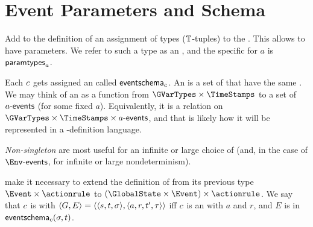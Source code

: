 \documentclass[12pt]{article}
\begin{document}
\section{Event Parameters and Schema} \label{eventparams}

Add to the definition of \Contract an assignment of types ($\mathbb{T}$-tuples) to the \Actions. This allows \Events to have parameters. We refer to such a type as an , and the specific \AParamsDomain for \Action $a$ is $\textsf{paramtypes}_{a}$.

Each  $c$ gets assigned an  called $\textsf{eventschema}_{c}$. An \EventSchema is a set of \Events that have the same \Action. We may think of an \EventSchema as a function from $\GVarTypes \times \TimeStamps$ to a set of $a\textsf{-events}$ (for some fixed $a$). Equivalently, it is a relation on $\GVarTypes \times \TimeStamps \times \depEvents{a}$, and that is likely how it will be represented in a \Contract-definition language. %

{\it Non-singleton} \EventSchema are most useful for an infinite or large choice of \Actions (and, in the case of $\depEvents{\Env}$, for infinite or large nondeterminism).

\EventSchema make it necessary to extend the definition of \compatible from its previous type $\Event \times \actionrule$ to $(\GlobalState \times \Event) \times \actionrule$. We say that \nameforaedge $c$ is  with  $\langle G,E\rangle = \langle\langle s,t,\sigma\rangle,\langle a,r,t',\tau\rangle\rangle$ iff
$c$ is an  with \Action $a$  and \Role $r$, and  $E$ is in $\textsf{eventschema}_{c}(\sigma, t)$.

\end{document}
